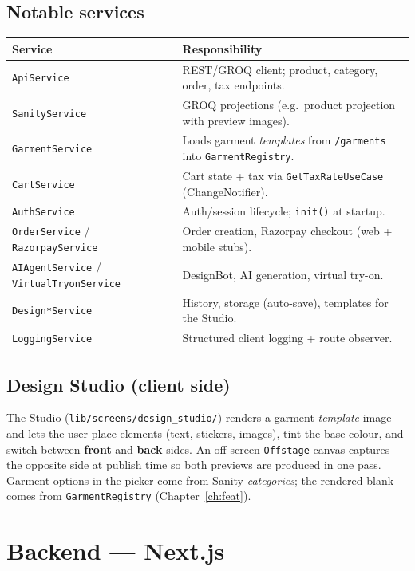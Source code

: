 \documentclass[11pt,a4paper]{report}
\newcommand{\code}[1]{\texttt{#1}}
\begin{document}
\section{Notable services}
{\small
\begin{longtable}{@{}p{4.4cm}p{9.5cm}@{}}
\toprule
\textbf{Service} & \textbf{Responsibility}\\
\midrule
\endhead
\code{ApiService} & REST/GROQ client; product, category, order, tax endpoints.\\
\code{SanityService} & GROQ projections (e.g.\ product projection with preview images).\\
\code{GarmentService} & Loads garment \emph{templates} from \code{/garments} into \code{GarmentRegistry}.\\
\code{CartService} & Cart state + tax via \code{GetTaxRateUseCase} (ChangeNotifier).\\
\code{AuthService} & Auth/session lifecycle; \code{init()} at startup.\\
\code{OrderService} / \code{RazorpayService} & Order creation, Razorpay checkout (web + mobile stubs).\\
\code{AIAgentService} / \code{VirtualTryonService} & DesignBot, AI generation, virtual try-on.\\
\code{Design*Service} & History, storage (auto-save), templates for the Studio.\\
\code{LoggingService} & Structured client logging + route observer.\\
\bottomrule
\end{longtable}
}

\section{Design Studio (client side)}
The Studio (\code{lib/screens/design\_studio/}) renders a garment \emph{template} image and
lets the user place elements (text, stickers, images), tint the base colour, and switch
between \textbf{front} and \textbf{back} sides. An off-screen \code{Offstage} canvas
captures the opposite side at publish time so both previews are produced in one pass.
Garment options in the picker come from Sanity \emph{categories}; the rendered blank
comes from \code{GarmentRegistry} (Chapter~\ref{ch:feat}).

\chapter{Backend --- Next.js}\label{ch:be}
\end{document}
